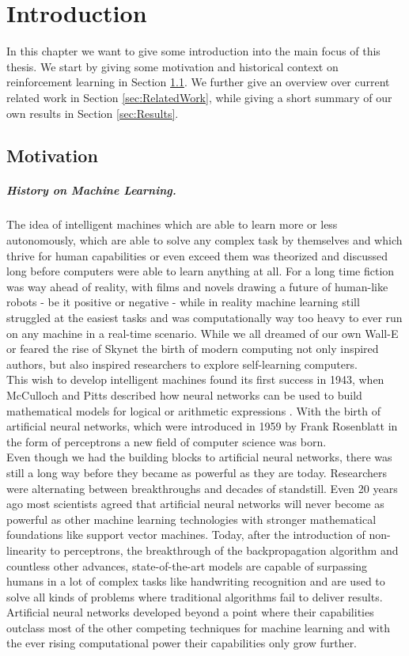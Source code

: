\chapter{Introduction} \label{chp:Introduction}
In this chapter we want to give some introduction into the main focus of this thesis. We start by giving some motivation and historical context on reinforcement learning in Section \ref{sec:Motivation}. We further give an overview over current related work in Section \ref{sec:RelatedWork}, while giving a short summary of our own results in Section \ref{sec:Results}.  

\section{Motivation} \label{sec:Motivation}
\paragraph{History on Machine Learning.}
The idea of intelligent machines which are able to learn more or less autonomously, which are able to solve any complex task by themselves and which thrive for human capabilities or even exceed them was theorized and discussed long before computers were able to learn anything at all. For a long time fiction was way ahead of reality, with films and novels drawing a future of human-like robots - be it positive or negative - while in reality machine learning still struggled at the easiest tasks and was computationally way too heavy to ever run on any machine in a real-time scenario. While we all dreamed of our own Wall-E or feared the rise of Skynet the birth of modern computing not only inspired authors, but also inspired researchers to explore self-learning computers. \\
 This wish to develop intelligent machines found its first success in 1943, when McCulloch and Pitts described how neural networks can be used to build mathematical models for logical or arithmetic expressions \cite{mcculloch1943logical}. With the birth of artificial neural networks, which were introduced in 1959 by Frank Rosenblatt in the form of perceptrons \cite{rosenblatt1958perceptron} a new field of computer science was born. \\
 Even though we had the building blocks to artificial neural networks, there was still a long way before they became as powerful as they are today. Researchers were alternating between breakthroughs and decades of standstill. Even 20 years ago most scientists agreed that artificial neural networks will never become as powerful as other machine learning technologies with stronger mathematical foundations like support vector machines. Today, after the introduction of non-linearity to perceptrons, the breakthrough of the backpropagation algorithm and countless other advances, state-of-the-art models are capable of surpassing humans in a lot of complex tasks like handwriting recognition and are used to solve all kinds of problems where traditional algorithms fail to deliver results. Artificial neural networks developed beyond a point where their capabilities outclass most of the other competing techniques for machine learning and with the ever rising computational power their capabilities only grow further.
